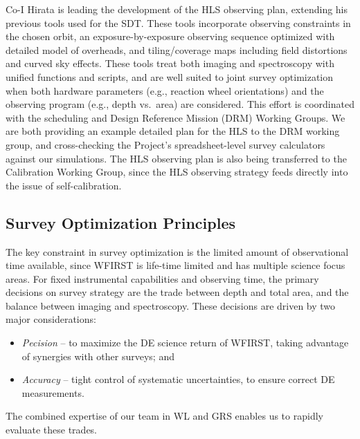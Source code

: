 

\begin{summary}
Co-I Hirata is leading the development of the HLS observing plan, extending his
previous tools used for the SDT. These tools incorporate observing constraints
in the chosen orbit, an exposure-by-exposure observing sequence optimized with
detailed model of overheads, and tiling/coverage maps including field
distortions and curved sky effects. These tools treat both imaging and
spectroscopy with unified functions and scripts, and are well suited to joint
survey optimization when both hardware parameters (e.g., reaction wheel
orientations) and the observing program (e.g., depth vs.\ area) are considered.
This effort is coordinated with the scheduling and Design Reference Mission (DRM)
Working Groups. We are both providing an example detailed plan for the HLS to
the DRM working group, and cross-checking the Project's spreadsheet-level survey
calculators against our simulations. The HLS observing plan is also being
transferred to the Calibration Working Group, since the HLS observing strategy
feeds directly into the issue of self-calibration.
\end{summary}

\subsection{Survey Optimization Principles}
\label{sec:sur_opt}

The key constraint in survey optimization is the limited amount of observational time
available, since WFIRST is life-time limited and has multiple science focus areas.
For fixed instrumental capabilities and observing time, the primary
decisions on survey strategy are the trade between depth and total area, and
the balance between imaging and spectroscopy.
These decisions are driven by two major considerations:
\begin{itemize}
\item \emph{Pecision} -- to maximize the DE science return of WFIRST, taking advantage of synergies with other surveys; and
\item \emph{Accuracy} -- tight control of systematic uncertainties, to ensure correct DE measurements.
\end{itemize}
The combined expertise of our team in WL and GRS enables us to rapidly evaluate
these trades.

